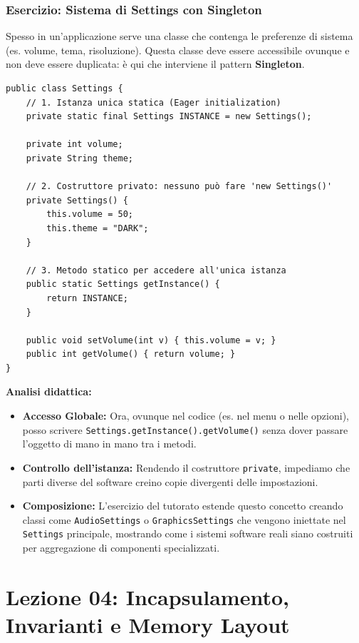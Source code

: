\documentclass[12pt, a4paper]{article}
\begin{document}
\subsubsection{Esercizio: Sistema di Settings con Singleton}
Spesso in un'applicazione serve una classe che contenga le preferenze di sistema (es. volume, tema, risoluzione). Questa classe deve essere accessibile ovunque e non deve essere duplicata: è qui che interviene il pattern \textbf{Singleton}.

\begin{verbatim}
public class Settings {
    // 1. Istanza unica statica (Eager initialization)
    private static final Settings INSTANCE = new Settings();

    private int volume;
    private String theme;

    // 2. Costruttore privato: nessuno può fare 'new Settings()'
    private Settings() {
        this.volume = 50;
        this.theme = "DARK";
    }

    // 3. Metodo statico per accedere all'unica istanza
    public static Settings getInstance() {
        return INSTANCE;
    }

    public void setVolume(int v) { this.volume = v; }
    public int getVolume() { return volume; }
}
\end{verbatim}

\textbf{Analisi didattica:}
\begin{itemize}
    \item \textbf{Accesso Globale:} Ora, ovunque nel codice (es. nel menu o nelle opzioni), posso scrivere \texttt{Settings.getInstance().getVolume()} senza dover passare l'oggetto di mano in mano tra i metodi.
    \item \textbf{Controllo dell'istanza:} Rendendo il costruttore \texttt{private}, impediamo che parti diverse del software creino copie divergenti delle impostazioni.
    \item \textbf{Composizione:} L'esercizio del tutorato estende questo concetto creando classi come \texttt{AudioSettings} o \texttt{GraphicsSettings} che vengono iniettate nel \texttt{Settings} principale, mostrando come i sistemi software reali siano costruiti per aggregazione di componenti specializzati.
\end{itemize}

\section{Lezione 04: Incapsulamento, Invarianti e Memory Layout}
\end{document}
